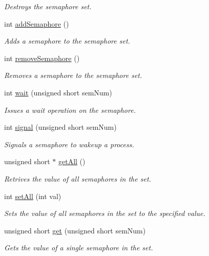 \begin{DoxyCompactItemize}
\begin{DoxyCompactList}\small\item\em Destroys the semaphore set. \end{DoxyCompactList}\item 
int \hyperlink{classSemaphoreSet_a6b1eca22231adc51209113a7e0e1d1e7}{add\-Semaphore} ()
\begin{DoxyCompactList}\small\item\em Adds a semaphore to the semaphore set. \end{DoxyCompactList}\item 
int \hyperlink{classSemaphoreSet_a3d6ae6868cfe3c052dfbd13f2913b036}{remove\-Semaphore} ()
\begin{DoxyCompactList}\small\item\em Removes a semaphore to the semaphore set. \end{DoxyCompactList}\item 
int \hyperlink{classSemaphoreSet_a835d01b6d87fddf4fcb452f2467153e5}{wait} (unsigned short sem\-Num)
\begin{DoxyCompactList}\small\item\em Issues a wait operation on the semaphore. \end{DoxyCompactList}\item 
int \hyperlink{classSemaphoreSet_a81f3eaf327c4ed2547a0962c9be52374}{signal} (unsigned short sem\-Num)
\begin{DoxyCompactList}\small\item\em Signals a semaphore to wakeup a process. \end{DoxyCompactList}\item 
unsigned short $\ast$ \hyperlink{classSemaphoreSet_a80a6f8e9c61a85c366ec61d290928d06}{get\-All} ()
\begin{DoxyCompactList}\small\item\em Retrives the value of all semaphores in the set. \end{DoxyCompactList}\item 
int \hyperlink{classSemaphoreSet_a80e1e53c0eb29c548c1d24556b0f8f9a}{set\-All} (int val)
\begin{DoxyCompactList}\small\item\em Sets the value of all semaphores in the set to the specified value. \end{DoxyCompactList}\item 
unsigned short \hyperlink{classSemaphoreSet_afe106fd82de68de0ba255c351c474580}{get} (unsigned short sem\-Num)
\begin{DoxyCompactList}\small\item\em Gets the value of a single semaphore in the set. \end{DoxyCompactList}\item 

\end{DoxyCompactItemize}
